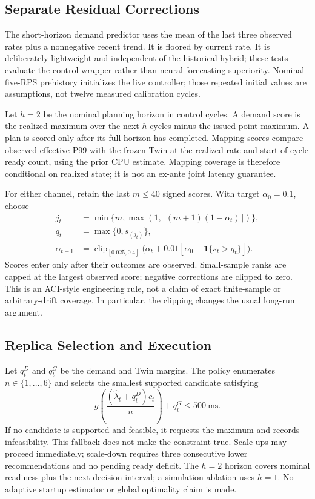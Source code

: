 \documentclass[11pt,a4paper]{article}
\begin{document}
\subsection{Separate Residual Corrections}
The short-horizon demand predictor uses the mean of the last three observed rates plus a nonnegative recent trend. It is floored by current rate. It is deliberately lightweight and independent of the historical hybrid; these tests evaluate the control wrapper rather than neural forecasting superiority. Nominal five-RPS prehistory initializes the live controller; those repeated initial values are assumptions, not twelve measured calibration cycles.

Let $h=2$ be the nominal planning horizon in control cycles. A demand score is the realized maximum over the next $h$ cycles minus the issued point maximum. A plan is scored only after its full horizon has completed. Mapping scores compare observed effective-P99 with the frozen Twin at the realized rate and start-of-cycle ready count, using the prior CPU estimate. Mapping coverage is therefore conditional on realized state; it is not an ex-ante joint latency guarantee.

For either channel, retain the last $m\leq40$ signed scores. With target $\alpha_0=0.1$, choose
\begin{align}
j_t&=\min\{m,\max(1,\lceil(m+1)(1-\alpha_t)\rceil)\},\\
q_t&=\max\{0,s_{(j_t)}\},\\
\alpha_{t+1}&=\operatorname{clip}_{[0.025,0.4]}\bigl(\alpha_t+0.01[\alpha_0-\mathbf1\{s_t>q_t\}]\bigr).
\end{align}
Scores enter only after their outcomes are observed. Small-sample ranks are capped at the largest observed score; negative corrections are clipped to zero. This is an ACI-style engineering rule, not a claim of exact finite-sample or arbitrary-drift coverage. In particular, the clipping changes the usual long-run argument.

\subsection{Replica Selection and Execution}
Let $q^D_t$ and $q^G_t$ be the demand and Twin margins. The policy enumerates $n\in\{1,\ldots,6\}$ and selects the smallest supported candidate satisfying
\begin{equation}g\!\left(\frac{(\widehat\lambda_t+q^D_t)c_t}{n}\right)+q^G_t\leq500\mathrm{\ ms}.\label{eq:decision}\end{equation}
If no candidate is supported and feasible, it requests the maximum and records infeasibility. This fallback does not make the constraint true. Scale-ups may proceed immediately; scale-down requires three consecutive lower recommendations and no pending ready deficit. The $h=2$ horizon covers nominal readiness plus the next decision interval; a simulation ablation uses $h=1$. No adaptive startup estimator or global optimality claim is made.
\end{document}
